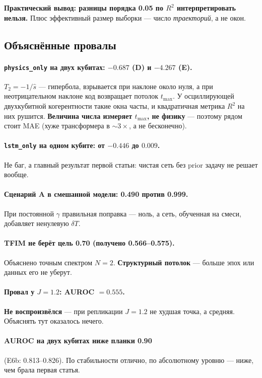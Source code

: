 \documentclass[12pt,a4paper]{article}
\newcommand{\code}[1]{\texttt{#1}}
\begin{document}
\textbf{Практический вывод: разницы порядка 0.05 по $R^2$ интерпретировать
нельзя.} Плюс эффективный размер выборки — число \emph{траекторий}, а не окон.

\subsection{Объяснённые провалы}

\paragraph{\code{physics\_only} на двух кубитах: $-0.687$ (D) и $-4.267$ (E).}
$T_2=-1/\hat{s}$ — гипербола, взрывается при наклоне около нуля, а при
неотрицательном наклоне код возвращает потолок $t_{\max}$. У осциллирующей
двухкубитной когерентности такие окна часты, и квадратичная метрика $R^2$ на них
рушится. \textbf{Величина числа измеряет $t_{\max}$, не физику} — поэтому рядом
стоит MAE (хуже трансформера в $\sim 3\times$, а не бесконечно).

\paragraph{\code{lstm\_only} на одном кубите: от $-0.446$ до $0.009$.} Не баг, а
главный результат первой статьи: чистая сеть без prior задачу не решает вообще.

\paragraph{Сценарий A в смешанной модели: 0.490 против 0.999.} При постоянной
$\gamma$ правильная поправка — ноль, а сеть, обученная на смеси, добавляет
ненулевую $\delta T$.

\paragraph{TFIM не берёт цель 0.70 (получено 0.566–0.575).} Объяснено точным
спектром $N=2$. \textbf{Структурный потолок} — больше эпох или данных его не
уберут.

\paragraph{Провал у $J=1.2$: AUROC $=0.555$.} \textbf{Не воспроизвёлся} — при
репликации $J=1.2$ не худшая точка, а средняя. Объяснять тут оказалось нечего.

\paragraph{AUROC на двух кубитах ниже планки 0.90} (E6b: 0.813–0.826). По
стабильности отлично, по абсолютному уровню — ниже, чем брала первая статья.
\end{document}
